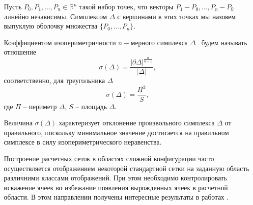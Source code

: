 \documentclass[a4paper,11pt,twoside]{article}
\begin{document}
\begin{dfn}
Пусть $ P_0,P_1, \dots, P_n \in \mathbb{R}^n $ такой набор точек, что векторы $P_1-P_0, \dots,P_n-P_0$ линейно независимы. Симплексом $\Delta$ с вершинами в этих точках мы назовем выпуклую оболочку множества $\{P_0, \dots,P_n\}$. 
\end{dfn}
	

\begin{dfn}
Коэффициентом изопериметричности $n-$мерного симплекса $\Delta$~\cite{Shur-KlSh} будем называть отношение
$$\sigma (\Delta)=\dfrac{{| \partial \Delta |}^{\frac{n}{n-1}}}{| \Delta |},$$
соответственно, для треугольника $\Delta$
$$\sigma (\Delta)=\dfrac{\Pi^2}{S},$$
где $\Pi$ -- периметр $\Delta$, $S$ -- площадь $\Delta$.
\end{dfn}
Величина $\sigma(\Delta)$ характеризует отклонение произвольного симплекса $\Delta$ от правильного, поскольку минимальное значение достигается на правильном симплексе в силу изопериметрического неравенства.

Построение расчетных сеток в областях сложной конфигурации часто осуществляется отображением некоторой стандартной сетки на заданную область различними классами отображений. При этом необходимо контролировать искажение ячеек во избежание появления вырожденных ячеек в расчетной области. В этом направлении получены интересные результаты в работах \cite{Shur-Azar, Shur-BIK, Shur-Kl,Shur-Bol, Shur-Ush, Shur-Mikl}. 
\end{document}
